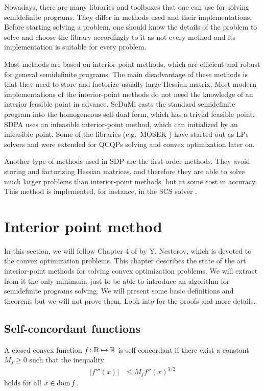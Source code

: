 Nowadays, there are many libraries and toolboxes that one can use for solving semidefinite programs.
They differ in methods used and their implementations.
Before starting solving a problem, one should know the details of the problem to solve and choose the library accordingly to it as not every method and its implementation is suitable for every problem.

Most methods are based on interior-point methods, which are efficient and robust for general semidefinite programs.
The main disadvantage of these methods is that they need to store and factorize usually large Hessian matrix.
Most modern implementations of the interior-point methods do not need the knowledge of an interior feasible point in advance.
SeDuMi \cite{sedumi} casts the standard semidefinite program into the homogeneous self-dual form, which has a trivial feasible point.
SDPA \cite{sdpa} uses an infeasible interior-point method, which can initialized by an infeasible point.
Some of the libraries (e.g.\ MOSEK \cite{mosek}) have started out as LPs solvers and were extended for QCQPs solving and convex optimization later on.

Another type of methods used in SDP are the first-order methods. 
They avoid storing and factorizing Hessian matrices, and therefore they are able to solve much larger problems than interior-point methods, but at some cost in accuracy.
This method is implemented, for instance, in the SCS solver \cite{scs}.

\section{Interior point method}
In this section, we will follow Chapter 4 of \cite{Nesterov-2004} by Y. Nesterov, which is devoted to the convex optimization problems.
This chapter describes the state of the art interior-point methods for solving convex optimization problems.
We will extract from it the only minimum, just to be able to introduce an algorithm for semidefinite programs solving.
We will present some basic definitions and theorems but we will not prove them.
Look into \cite{Nesterov-2004} for the proofs and more details.

\subsection{Self-concordant functions}
\begin{definition}
  A closed convex function $f\colon \mathbb{R} \mapsto \mathbb{R}$ is self-concordant if there exist a constant $M_f \geq 0$ such that the inequality
  \begin{align}
    |f'''(x)| &\leq M_f f''(x)^{3/2}
  \end{align}
  holds for all $x\in\operatorname{dom} f$.
\end{definition}

